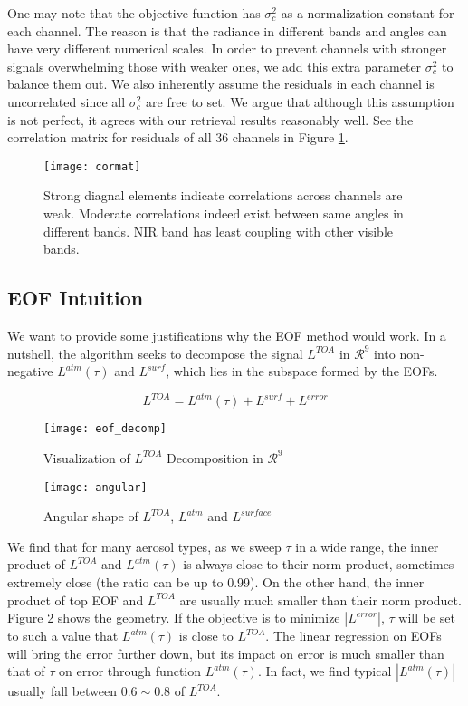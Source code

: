 One may note that the objective function has $\sigma_c^2$ as a normalization constant for each channel. The reason is that the radiance in different bands and angles can have very different numerical scales. In order to prevent channels with stronger signals overwhelming those with weaker ones, we add this extra parameter $\sigma_c^2$ to balance them out. We also inherently assume the residuals in each channel is uncorrelated since all $\sigma_c^2$ are free to set. We argue that although this assumption is not perfect, it agrees with our retrieval results reasonably well. See the correlation matrix for residuals of all 36 channels in Figure \ref{fig:cor}.

\begin{figure}[h!]
    \centering
    \texttt{[image: cormat]}
    \caption{Strong diagnal elements indicate correlations across channels are weak. Moderate correlations indeed exist between same angles in different bands. NIR band has least coupling with other visible bands.}
    \label{fig:cor}
\end{figure}

\label{misr_framework}

\clearpage
\subsection{EOF Intuition}
We want to provide some justifications why the EOF method would work. In a nutshell, the algorithm seeks to decompose the signal $L^{TOA}$ in $\mathcal{R}^9$ into non-negative $L^{atm}(\tau)$ and $L^{surf}$, which lies in the subspace formed by the EOFs.

\begin{equation*}
    L^{TOA} = L^{atm}(\tau) + L^{surf} + L^{error}
\end{equation*}

\begin{figure}[h!]
    \centering
    \texttt{[image: eof\_decomp]}
    \caption{Visualization of $L^{TOA}$ Decomposition in $\mathcal{R}^9$}
    \label{fig:eof_decomp}
\end{figure}

\begin{figure}[h!]
    \centering
    \texttt{[image: angular]}
    \caption{Angular shape of $L^{TOA}$, $L^{atm}$ and $L^{surface}$}
    \label{fig:angular}
\end{figure}

We find that for many aerosol types, as we sweep $\tau$ in a wide range, the inner product of $L^{TOA}$ and $L^{atm}(\tau)$ is always close to their norm product, sometimes extremely close (the ratio can be up to 0.99). On the other hand, the inner product of top EOF and $L^{TOA}$ are usually much smaller than their norm product. Figure \ref{fig:eof_decomp} shows the geometry. If the objective is to minimize $|L^{error}|$, $\tau$ will be set to such a value that $L^{atm}(\tau)$ is close to $L^{TOA}$. The linear regression on EOFs will bring the error further down, but its impact on error is much smaller than that of $\tau$ on error through function $L^{atm}(\tau)$. In fact, we find typical $|L^{atm}(\tau)|$ usually fall between $0.6\sim 0.8$ of $L^{TOA}$.

